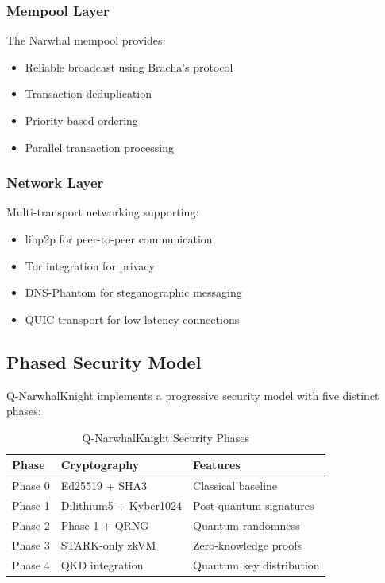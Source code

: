 \documentclass[11pt,a4paper]{article}
\begin{document}
\subsubsection{Mempool Layer}
The Narwhal mempool provides:
\begin{itemize}
    \item Reliable broadcast using Bracha's protocol
    \item Transaction deduplication
    \item Priority-based ordering
    \item Parallel transaction processing
\end{itemize}

\subsubsection{Network Layer}
Multi-transport networking supporting:
\begin{itemize}
    \item libp2p for peer-to-peer communication
    \item Tor integration for privacy
    \item DNS-Phantom for steganographic messaging
    \item QUIC transport for low-latency connections
\end{itemize}

\subsection{Phased Security Model}

Q-NarwhalKnight implements a progressive security model with five distinct phases:

\begin{table}[h]
\centering
\begin{tabular}{|l|l|l|}
\hline
\textbf{Phase} & \textbf{Cryptography} & \textbf{Features} \\
\hline
Phase 0 & Ed25519 + SHA3 & Classical baseline \\
Phase 1 & Dilithium5 + Kyber1024 & Post-quantum signatures \\
Phase 2 & Phase 1 + QRNG & Quantum randomness \\
Phase 3 & STARK-only zkVM & Zero-knowledge proofs \\
Phase 4 & QKD integration & Quantum key distribution \\
\hline
\end{tabular}
\caption{Q-NarwhalKnight Security Phases}
\end{table}
\end{document}
